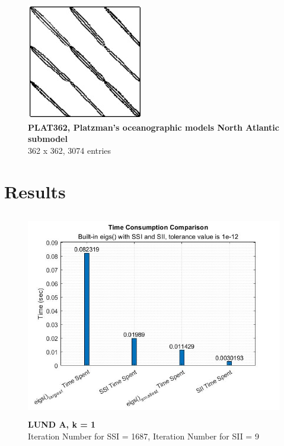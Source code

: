 \documentclass[12pt]{article}
\begin{document}
\begin{figure}[h]
	\centerline{\includegraphics[scale=.7]{plat.jpg}}
	\caption{\textbf{PLAT362, Platzman's oceanographic models
			North Atlantic submodel} \\
	362 x 362, 3074 entries}
	\label{fig3}
\end{figure}


\section{Results} 

\begin{figure}[H]
	\centerline{\includegraphics[height=9cm, width=12cm]{plot1lunda.jpg}}
	\caption{\textbf{LUND A, k = 1} \\ Iteration Number for SSI = 1687, Iteration Number for SII = 9}
	\label{fig4}\end{figure}
\end{document}
